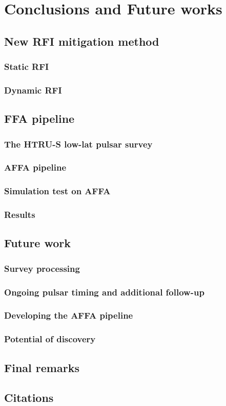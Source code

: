 \documentclass[thesis_msc.tex]{subfiles}
\begin{document}
\chapter{Conclusions and Future works} \label{Con}
\section{New RFI mitigation method}
\subsection{Static RFI}
\subsection{Dynamic RFI}
\section{FFA pipeline}
\subsection{The HTRU-S low-lat pulsar survey}
\subsection{AFFA pipeline}
\subsection{Simulation test on AFFA}
\subsection{Results}
\section{Future work}
\subsection{Survey processing}
\subsection{Ongoing pulsar timing and additional follow-up}
\subsection{Developing the AFFA pipeline}
\subsection{Potential of discovery}

\section{Final remarks}
\section{Citations}
\end{document}
